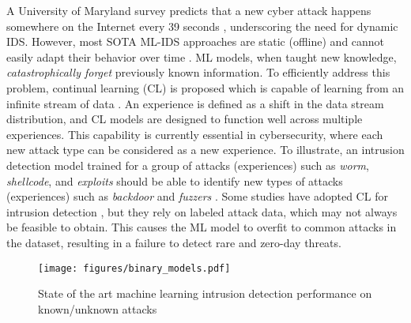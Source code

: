 A University of Maryland survey predicts that a new cyber attack happens somewhere on the Internet every 39 seconds \cite{hackerstudy2007}, underscoring the need for dynamic IDS. %
However, most SOTA ML-IDS approaches are static (offline) %
and cannot easily adapt their behavior over time \cite{verwimp2023continual}. ML models, when taught new knowledge, \textit{catastrophically forget} previously known information. To efficiently address this problem, continual learning (CL) is proposed which is capable of learning from an infinite stream of data \cite{wang2024comprehensive}. %
An experience is defined as a shift in the data stream distribution, and CL models are designed to function well across multiple experiences. This capability is currently essential in cybersecurity, where each new attack type can be considered as a new experience\cite{kozik2019balanced}. To illustrate, an intrusion detection model trained for a group of attacks (experiences) such as \textit{worm}, \textit{shellcode}, and \textit{exploits} should be able to identify new types of attacks (experiences) such as \textit{backdoor} and \textit{fuzzers} \cite{karn2021learning}. Some studies have adopted CL for intrusion detection \cite{kozik2019balanced, karn2021learning, prasath2022analysis, kumar2023augmented, oikonomou2023multi, channappayya2024augmented}, but they rely on labeled attack data, which may not always be feasible to obtain. This causes the ML model to overfit to common attacks in the dataset, resulting in a failure to detect rare and zero-day threats.
\begin{figure}
    \centering
    \texttt{[image: figures/binary\_models.pdf]}
    \caption{State of the art machine learning intrusion detection performance on known/unknown attacks}
    \label{fig:unknown_attacks}
\end{figure}

